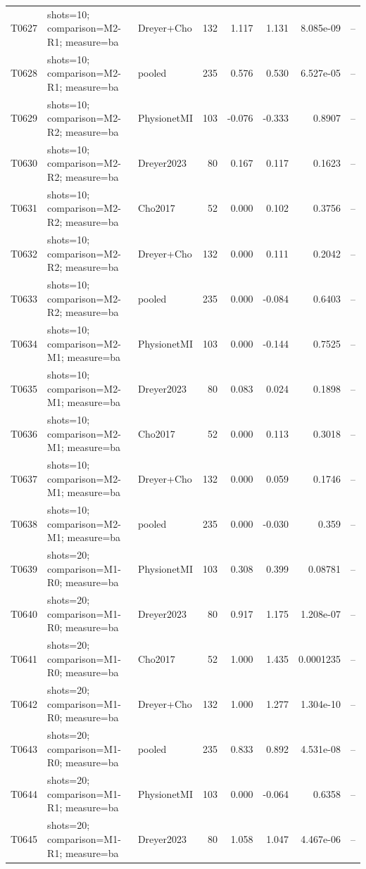 \begin{longtable}{p{.45in}p{2.6in}p{.75in}rrrrr}
T0627 & shots=10; comparison=M2-R1; measure=ba & Dreyer+Cho & 132 & 1.117 & 1.131 & 8.085e-09 & -- \\
T0628 & shots=10; comparison=M2-R1; measure=ba & pooled & 235 & 0.576 & 0.530 & 6.527e-05 & -- \\
T0629 & shots=10; comparison=M2-R2; measure=ba & PhysionetMI & 103 & -0.076 & -0.333 & 0.8907 & -- \\
T0630 & shots=10; comparison=M2-R2; measure=ba & Dreyer2023 & 80 & 0.167 & 0.117 & 0.1623 & -- \\
T0631 & shots=10; comparison=M2-R2; measure=ba & Cho2017 & 52 & 0.000 & 0.102 & 0.3756 & -- \\
T0632 & shots=10; comparison=M2-R2; measure=ba & Dreyer+Cho & 132 & 0.000 & 0.111 & 0.2042 & -- \\
T0633 & shots=10; comparison=M2-R2; measure=ba & pooled & 235 & 0.000 & -0.084 & 0.6403 & -- \\
T0634 & shots=10; comparison=M2-M1; measure=ba & PhysionetMI & 103 & 0.000 & -0.144 & 0.7525 & -- \\
T0635 & shots=10; comparison=M2-M1; measure=ba & Dreyer2023 & 80 & 0.083 & 0.024 & 0.1898 & -- \\
T0636 & shots=10; comparison=M2-M1; measure=ba & Cho2017 & 52 & 0.000 & 0.113 & 0.3018 & -- \\
T0637 & shots=10; comparison=M2-M1; measure=ba & Dreyer+Cho & 132 & 0.000 & 0.059 & 0.1746 & -- \\
T0638 & shots=10; comparison=M2-M1; measure=ba & pooled & 235 & 0.000 & -0.030 & 0.359 & -- \\
T0639 & shots=20; comparison=M1-R0; measure=ba & PhysionetMI & 103 & 0.308 & 0.399 & 0.08781 & -- \\
T0640 & shots=20; comparison=M1-R0; measure=ba & Dreyer2023 & 80 & 0.917 & 1.175 & 1.208e-07 & -- \\
T0641 & shots=20; comparison=M1-R0; measure=ba & Cho2017 & 52 & 1.000 & 1.435 & 0.0001235 & -- \\
T0642 & shots=20; comparison=M1-R0; measure=ba & Dreyer+Cho & 132 & 1.000 & 1.277 & 1.304e-10 & -- \\
T0643 & shots=20; comparison=M1-R0; measure=ba & pooled & 235 & 0.833 & 0.892 & 4.531e-08 & -- \\
T0644 & shots=20; comparison=M1-R1; measure=ba & PhysionetMI & 103 & 0.000 & -0.064 & 0.6358 & -- \\
T0645 & shots=20; comparison=M1-R1; measure=ba & Dreyer2023 & 80 & 1.058 & 1.047 & 4.467e-06 & -- \\

\end{longtable}
